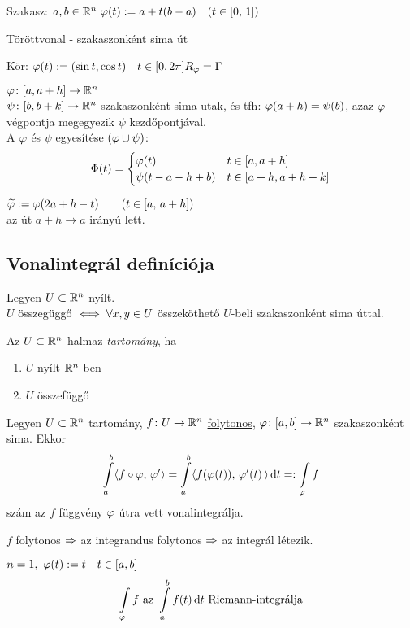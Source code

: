 \begin{Pl}
\item Szakasz: $a,b\in \mathbb{R}^n\ \varphi(t) := a+t(b-a)\quad(t\in[0,\,1])$
\item Töröttvonal - szakaszonként sima út
\item Kör: $\varphi(t) := (\sin t,\cos t)\quad t\in[0,2\pi]\\
  R_\varphi=\Gamma$
\end{Pl}


\begin{de}
  $\varphi\colon [a,a+h]\to\mathbb{R}^n$\\$\psi\colon[b,b+k]\to\mathbb{R}^n$ szakaszonként sima utak, és tfh: $\varphi(a+h)=\psi(b)$, azaz
  $\varphi$ végpontja megegyezik $\psi$ kezdőpontjával. \\
  A $\varphi$ és $\psi$ egyesítése $(\varphi\cup\psi)$:
\[\Phi(t) = \begin{cases}\varphi(t) & t\in[a,a+h]\\\psi(t-a-h+b) & t\in[a+h,a+h+k]\end{cases}\]
\end{de}

\begin{de} $\widetilde{\varphi} := \varphi(2a+h-t)\qquad(t\in[a,\,a+h])$\\
  az út $a+h\to a$ irányú lett.
\end{de}

\subsection{Vonalintegrál definíciója}
\begin{te}Legyen $U\subset \mathbb{R}^n$ nyílt.\\
  $U$ összegüggő $\iff \forall x,y\in  U$ összeköthető $U$-beli szakaszonként
  sima úttal.
\end{te}

\begin{de}[Tartomány]Az $U\subset \mathbb{R}^n$ halmaz \emph{tartomány}, ha
{\listazjromai
  \begin{enumerate}
    \item $U$ nyílt $\mathbb{R}^n$-ben
    \item $U$ összefüggő
  \end{enumerate}
}
\end{de}
\begin{de}
  Legyen $U\subset \mathbb{R}^n$ tartomány, $f\colon U\to\mathbb{R}^n$ \underline{folytonos}, $\varphi\colon [a,b]\to\mathbb{R}^n$ szakaszonként
  sima. Ekkor
\[\Int_a^b\skalar{f\circ\vfi}{\vfi'} = \Int_a^b\skalar{f(\vfi(t))}{\vfi'(t)\,}\diff t =: \Int_\vfi f\]
szám az $f$ függvény $\varphi$ útra vett vonalintegrálja.
\end{de}
\newpage
\begin{Megj}
  \item $f$ folytonos $\Rightarrow$ az integrandus folytonos $\Rightarrow$ az integrál létezik.
\item $n=1,\ \varphi(t) := t\quad t\in[a,b]$
\[\Int_\vfi f \text{ az } \Int_a^bf(t)\diff t \text{ Riemann-integrálja}\]
\end{Megj}

